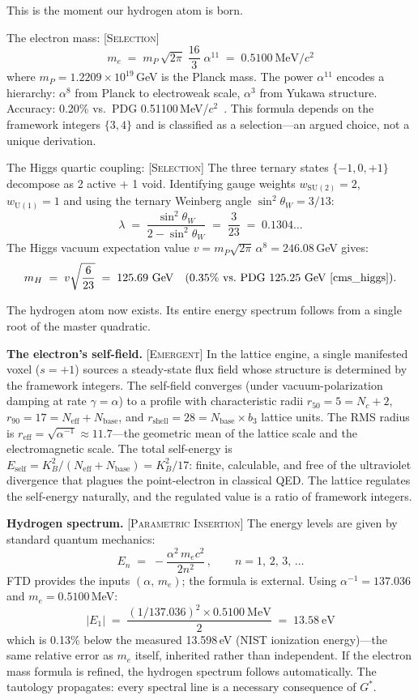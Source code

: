 \documentclass[12pt]{article}
\newcommand{\etag}[1]{{\normalfont\textsc{\footnotesize [#1]}}}
\theoremstyle{compact}
\begin{document}
This is the moment our hydrogen atom is born.

The electron mass: \etag{Selection}
\[
m_e \;=\; m_P\,\sqrt{2\pi}\;\frac{16}{3}\;\alpha^{11} \;=\; 0.5100~\mathrm{MeV}/c^2
\]
where $m_P = 1.2209 \times 10^{19}$\,GeV is the Planck mass. The power $\alpha^{11}$ encodes a hierarchy: $\alpha^8$ from Planck to electroweak scale, $\alpha^3$ from Yukawa structure. Accuracy: 0.20\% vs.\ PDG 0.51100\,MeV/$c^2$~\cite{pdg}. This formula depends on the framework integers $\{3, 4\}$ and is classified as a selection---an argued choice, not a unique derivation.

The Higgs quartic coupling: \etag{Selection} The three ternary states $\{-1, 0, +1\}$ decompose as 2 active $+$ 1 void. Identifying gauge weights $w_{\mathrm{SU}(2)} = 2$, $w_{\mathrm{U}(1)} = 1$ and using the ternary Weinberg angle $\sin^2\theta_W = 3/13$:
\[
\lambda \;=\; \frac{\sin^2\theta_W}{2 - \sin^2\theta_W} \;=\; \frac{3}{23} \;=\; 0.1304\ldots
\]
The Higgs vacuum expectation value $v = m_P\sqrt{2\pi}\,\alpha^8 = 246.08$\,GeV gives:
\[
m_H \;=\; v\sqrt{\frac{6}{23}} \;=\; 125.69~\mathrm{GeV} \quad (0.35\%~\text{vs.\ PDG}~125.25~\text{GeV}~\cite{cms_higgs}).
\]

The hydrogen atom now exists. Its entire energy spectrum follows from a single root of the master quadratic.

\smallskip
\noindent\textbf{The electron's self-field.} \etag{Emergent} In the lattice engine, a single manifested voxel ($s = +1$) sources a steady-state flux field whose structure is determined by the framework integers. The self-field converges (under vacuum-polarization damping at rate $\gamma = \alpha$) to a profile with characteristic radii $r_{50} = 5 = N_c + 2$, $r_{90} = 17 = N_{\mathrm{eff}} + N_{\mathrm{base}}$, and $r_{\mathrm{shell}} = 28 = N_{\mathrm{base}} \times b_3$ lattice units. The RMS radius is $r_{\mathrm{eff}} = \sqrt{\alpha^{-1}} \approx 11.7$---the geometric mean of the lattice scale and the electromagnetic scale. The total self-energy is $E_{\mathrm{self}} = K_B^2/(N_{\mathrm{eff}} + N_{\mathrm{base}}) = K_B^2/17$: finite, calculable, and free of the ultraviolet divergence that plagues the point-electron in classical QED. The lattice regulates the self-energy naturally, and the regulated value is a ratio of framework integers.

\smallskip
\noindent\textbf{Hydrogen spectrum.} \etag{Parametric Insertion} The energy levels are given by standard quantum mechanics:
\[
E_n \;=\; -\frac{\alpha^2\,m_e c^2}{2n^2}\,, \qquad n = 1,\,2,\,3,\,\ldots
\]
FTD provides the inputs $(\alpha,\, m_e)$; the formula is external. Using $\alpha^{-1} = 137.036$ and $m_e = 0.5100$\,MeV:
\[
|E_1| \;=\; \frac{(1/137.036)^2 \times 0.5100~\mathrm{MeV}}{2} \;=\; 13.58~\mathrm{eV}
\]
which is 0.13\% below the measured 13.598\,eV (NIST ionization energy)---the same relative error as $m_e$ itself, inherited rather than independent. If the electron mass formula is refined, the hydrogen spectrum follows automatically. The tautology propagates: every spectral line is a necessary consequence of ${G^{*}}$.
\end{document}
